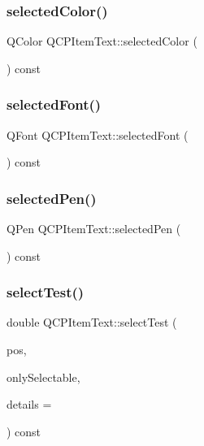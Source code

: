 \subsubsection{\texorpdfstring{selectedColor()}{selectedColor()}}
{\footnotesize\ttfamily Q\+Color Q\+C\+P\+Item\+Text\+::selected\+Color (\begin{DoxyParamCaption}{ }\end{DoxyParamCaption}) const\hspace{0.3cm}{\ttfamily [inline]}}

\mbox{\label{class_q_c_p_item_text_a74c947c6193e3b47884fac84fdb29922}} 
\subsubsection{\texorpdfstring{selectedFont()}{selectedFont()}}
{\footnotesize\ttfamily Q\+Font Q\+C\+P\+Item\+Text\+::selected\+Font (\begin{DoxyParamCaption}{ }\end{DoxyParamCaption}) const\hspace{0.3cm}{\ttfamily [inline]}}

\mbox{\label{class_q_c_p_item_text_a852a79afa0e88e29e11474d323440126}} 
\subsubsection{\texorpdfstring{selectedPen()}{selectedPen()}}
{\footnotesize\ttfamily Q\+Pen Q\+C\+P\+Item\+Text\+::selected\+Pen (\begin{DoxyParamCaption}{ }\end{DoxyParamCaption}) const\hspace{0.3cm}{\ttfamily [inline]}}

\mbox{\label{class_q_c_p_item_text_a676aaec10ad3cc4d7d0e4847db04c838}} 
\subsubsection{\texorpdfstring{selectTest()}{selectTest()}}
{\footnotesize\ttfamily double Q\+C\+P\+Item\+Text\+::select\+Test (\begin{DoxyParamCaption}\item[{const Q\+PointF \&}]{pos,  }\item[{bool}]{only\+Selectable,  }\item[{Q\+Variant $\ast$}]{details = {} }\end{DoxyParamCaption}) const\hspace{0.3cm}{\ttfamily [virtual]}}

